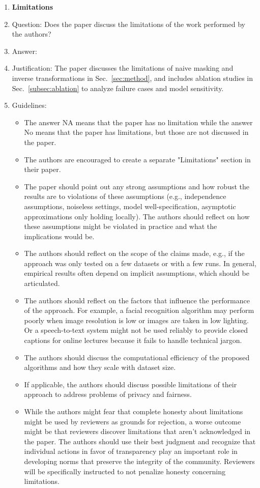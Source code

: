 \documentclass{article}
\theoremstyle{plain}
\theoremstyle{definition}
\theoremstyle{remark}
\begin{document}
{\begin{enumerate}
\item {\bf Limitations}
    \item[] Question: Does the paper discuss the limitations of the work performed by the authors?
    \item[] Answer: \answerYes{}
    \item[] Justification: The paper discusses the limitations of naive masking and inverse transformations in Sec.~\ref{sec:method}, and includes ablation studies in Sec.~\ref{subsec:ablation} to analyze failure cases and model sensitivity.
    \item[] Guidelines:
    \begin{itemize}
        \item The answer NA means that the paper has no limitation while the answer No means that the paper has limitations, but those are not discussed in the paper. 
        \item The authors are encouraged to create a separate "Limitations" section in their paper.
        \item The paper should point out any strong assumptions and how robust the results are to violations of these assumptions (e.g., independence assumptions, noiseless settings, model well-specification, asymptotic approximations only holding locally). The authors should reflect on how these assumptions might be violated in practice and what the implications would be.
        \item The authors should reflect on the scope of the claims made, e.g., if the approach was only tested on a few datasets or with a few runs. In general, empirical results often depend on implicit assumptions, which should be articulated.
        \item The authors should reflect on the factors that influence the performance of the approach. For example, a facial recognition algorithm may perform poorly when image resolution is low or images are taken in low lighting. Or a speech-to-text system might not be used reliably to provide closed captions for online lectures because it fails to handle technical jargon.
        \item The authors should discuss the computational efficiency of the proposed algorithms and how they scale with dataset size.
        \item If applicable, the authors should discuss possible limitations of their approach to address problems of privacy and fairness.
        \item While the authors might fear that complete honesty about limitations might be used by reviewers as grounds for rejection, a worse outcome might be that reviewers discover limitations that aren't acknowledged in the paper. The authors should use their best judgment and recognize that individual actions in favor of transparency play an important role in developing norms that preserve the integrity of the community. Reviewers will be specifically instructed to not penalize honesty concerning limitations.
    \end{itemize}


\end{enumerate}}
\end{document}
